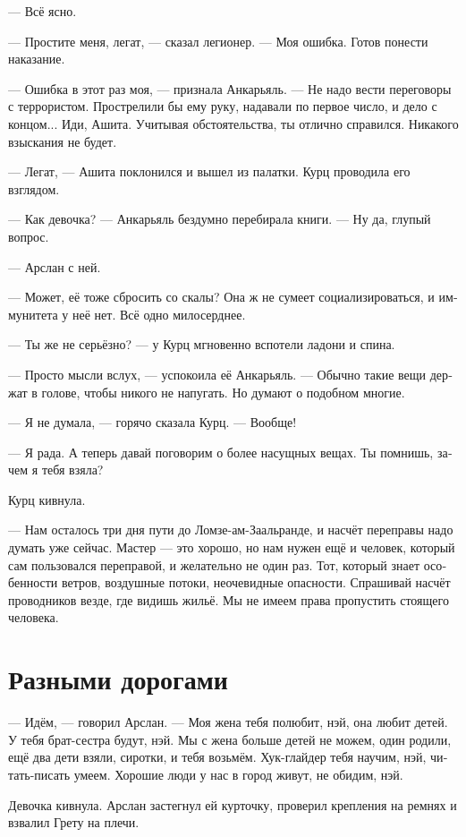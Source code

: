 \documentclass[a4paper,12pt,fleqn]{book}\usepackage{polyglossia}\setdefaultlanguage[babelshorthands=true]{russian}\setotherlanguage{english}\defaultfontfeatures{Ligatures=TeX,Mapping=tex-text}\usepackage{xcolor}\newcommand{\ml}[3]{#2}
\begin{document}
--- Всё ясно.

--- Простите меня, легат, --- сказал легионер.
--- Моя ошибка.
Готов понести наказание.

--- Ошибка в этот раз моя, --- признала Анкарьяль.
--- Не надо вести переговоры с террористом.
Прострелили бы ему руку, надавали по первое число, и дело с концом...
Иди, Ашита.
Учитывая обстоятельства, ты отлично справился.
Никакого взыскания не будет.

--- Легат, --- Ашита поклонился и вышел из палатки.
Курц проводила его взглядом.

--- Как девочка? --- Анкарьяль бездумно перебирала книги.
--- Ну да, глупый вопрос.

--- Арслан с ней.

--- Может, её тоже сбросить со скалы?
Она ж не сумеет социализироваться, и иммунитета у неё нет.
Всё одно милосерднее.

--- Ты же не серьёзно? --- у Курц мгновенно вспотели ладони и спина.

--- Просто мысли вслух, --- успокоила её Анкарьяль.
--- Обычно такие вещи держат в голове, чтобы никого не напугать.
Но думают о подобном многие.

--- Я не думала, --- горячо сказала Курц.
--- Вообще!

--- Я рада.
А теперь давай поговорим о более насущных вещах.
Ты помнишь, зачем я тебя взяла?

Курц кивнула.

--- Нам осталось три дня пути до Ломзе-ам-Заальранде, и насчёт переправы надо думать уже сейчас.
Мастер --- это хорошо, но нам нужен ещё и человек, который сам пользовался переправой, и желательно не один раз.
Тот, который знает особенности ветров, воздушные потоки, неочевидные опасности.
Спрашивай насчёт проводников везде, где видишь жильё.
Мы не имеем права пропустить стоящего человека.

\section{Разными дорогами}

--- Идём, --- говорил Арслан.
--- Моя жена тебя полюбит, нэй, она любит детей.
У тебя брат-сестра будут, нэй.
Мы с жена больше детей не можем, один родили, ещё два дети взяли, сиротки, и тебя возьмём.
Хук-глайдер тебя научим, нэй, читать-писать умеем.
Хорошие люди у нас в город живут, не обидим, нэй.

Девочка кивнула.
Арслан застегнул ей курточку, проверил крепления на ремнях и взвалил Грету на плечи.
\end{document}

